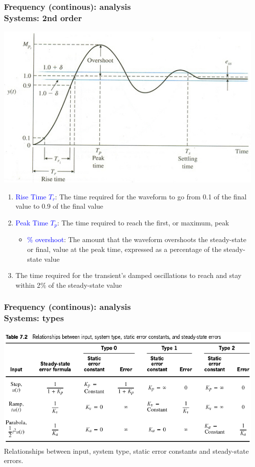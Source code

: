\documentclass[hyperref={pdfpagelabels=true}]{beamer}
\begin{document}
\begin{frame}
\frametitle{Frequency (continous): analysis \\ {\large Systems: 2nd order}}
\centering
\includegraphics[scale = 1]{figs/Selection_030.jpg}
\scriptsize{
\begin{enumerate}
\item \textcolor{blue}{Rise Time $T_r$}: The time required for the waveform to go from 0.1
of the final value to 0.9 of the final value
\item \textcolor{blue}{Peak Time $T_p$}: The time required to reach the first, or maximum,
peak
\begin{itemize}
\item \textcolor{blue}{$\%$ overshoot}: The amount that the waveform overshoots
the steady-state or final, value at the peak time, expressed
as a percentage of the steady-state value
\end{itemize}
\item The time required for the transient's damped
oscillations to reach and stay within 2$\%$ of the steady-state value
\end{enumerate}}
\end{frame}

\begin{frame}
\frametitle{Frequency (continous): analysis \\ {\large Systems: types}}
\includegraphics[scale = .58]{figs/Selection_031.PNG} \\
Relationships between input, system type, static error constants and steady-state errors.
\end{frame}
\end{document}
